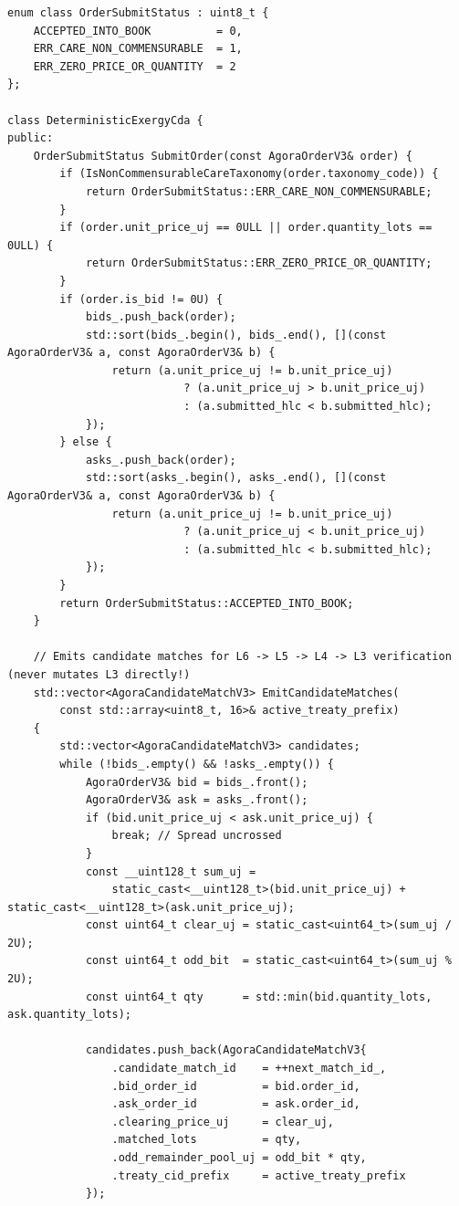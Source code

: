 \begin{lstlisting}
enum class OrderSubmitStatus : uint8_t {
    ACCEPTED_INTO_BOOK          = 0,
    ERR_CARE_NON_COMMENSURABLE  = 1,
    ERR_ZERO_PRICE_OR_QUANTITY  = 2
};

class DeterministicExergyCda {
public:
    OrderSubmitStatus SubmitOrder(const AgoraOrderV3& order) {
        if (IsNonCommensurableCareTaxonomy(order.taxonomy_code)) {
            return OrderSubmitStatus::ERR_CARE_NON_COMMENSURABLE;
        }
        if (order.unit_price_uj == 0ULL || order.quantity_lots == 0ULL) {
            return OrderSubmitStatus::ERR_ZERO_PRICE_OR_QUANTITY;
        }
        if (order.is_bid != 0U) {
            bids_.push_back(order);
            std::sort(bids_.begin(), bids_.end(), [](const AgoraOrderV3& a, const AgoraOrderV3& b) {
                return (a.unit_price_uj != b.unit_price_uj)
                           ? (a.unit_price_uj > b.unit_price_uj)
                           : (a.submitted_hlc < b.submitted_hlc);
            });
        } else {
            asks_.push_back(order);
            std::sort(asks_.begin(), asks_.end(), [](const AgoraOrderV3& a, const AgoraOrderV3& b) {
                return (a.unit_price_uj != b.unit_price_uj)
                           ? (a.unit_price_uj < b.unit_price_uj)
                           : (a.submitted_hlc < b.submitted_hlc);
            });
        }
        return OrderSubmitStatus::ACCEPTED_INTO_BOOK;
    }

    // Emits candidate matches for L6 -> L5 -> L4 -> L3 verification (never mutates L3 directly!)
    std::vector<AgoraCandidateMatchV3> EmitCandidateMatches(
        const std::array<uint8_t, 16>& active_treaty_prefix)
    {
        std::vector<AgoraCandidateMatchV3> candidates;
        while (!bids_.empty() && !asks_.empty()) {
            AgoraOrderV3& bid = bids_.front();
            AgoraOrderV3& ask = asks_.front();
            if (bid.unit_price_uj < ask.unit_price_uj) {
                break; // Spread uncrossed
            }
            const __uint128_t sum_uj =
                static_cast<__uint128_t>(bid.unit_price_uj) + static_cast<__uint128_t>(ask.unit_price_uj);
            const uint64_t clear_uj = static_cast<uint64_t>(sum_uj / 2U);
            const uint64_t odd_bit  = static_cast<uint64_t>(sum_uj % 2U);
            const uint64_t qty      = std::min(bid.quantity_lots, ask.quantity_lots);

            candidates.push_back(AgoraCandidateMatchV3{
                .candidate_match_id    = ++next_match_id_,
                .bid_order_id          = bid.order_id,
                .ask_order_id          = ask.order_id,
                .clearing_price_uj     = clear_uj,
                .matched_lots          = qty,
                .odd_remainder_pool_uj = odd_bit * qty,
                .treaty_cid_prefix     = active_treaty_prefix
            });


\end{lstlisting}
